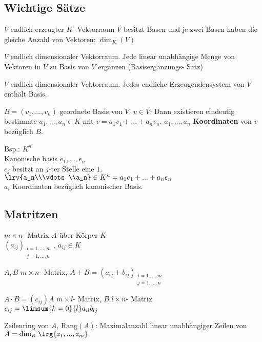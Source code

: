 \subsection{Wichtige Sätze}
		\item $V$ endlich erzeugter $K$- Vektorraum $V$ besitzt Basen und je zwei Basen haben die gleiche Anzahl von Vektoren: $\dim_K(V)$
		\item $V$ endlich dimensionaler Vektorraum. Jede linear unabhängige Menge von Vektoren in $V$ zu Basis von $V$ ergänzen (Basisergänzungs- Satz)
		\item $V$ endlich dimensionaler Vektorraum. Jedes endliche Erzeugendensystem von $V$ enthält Basis.
		\item $B=(v_1,...,v_n)$ geordnete Basis von $V$. $v\in V$. Dann existieren eindeutig bestimmte $a_1,...,a_n\in K$ mit $v=a_1v_1+...+a_nv_n$. $a_1,...,a_n$ \textbf{Koordinaten} von $v$ bezüglich $B$.
		
		Bsp.: $K^n$\\
		Kanonische basis $e_1,...,e_n$\\
		$e_j$ besitzt an $j$-ter Stelle eine $1$.\\
		$\lrv{a_n\\\vdots\\a_n}\in K^n=a_1e_1+...+a_ne_n$\\
		$a_i$ Koordinaten bezüglich kanonischer Basis.
	\subExEnd
	
\subsection{Matritzen}
		\item $m\times n$- Matrix $A$ über Körper $K$\\
		$(a_{ij})_{
			\begin{array}{l}
			i=1,...,m\\
			j=1,...,n
			\end{array}
		},\ a_{ij}\in K$
		\item $A,B$ $m\times n$- Matrix, $A+B=(a_{ij}+b_{ij})_{
			\begin{array}{l}
			i=1,...,m\\
			j=1,...,n
			\end{array}
		}$
		\item $A\cdot B=(c_{ij})$\quad $A$ $m\times l$- Matrix, $B$ $l\times n$- Matrix\\
		$c_{ij}=\limsum{k=0}{l}a_{il}b_{lj}$
		\item Zeilenring von $A$, $\mbox{Rang}(A)$: Maximalanzahl linear unabhängiger Zeilen von $A=\dim_K\lrg{z_1,...,z_m}$
	\subExEnd

